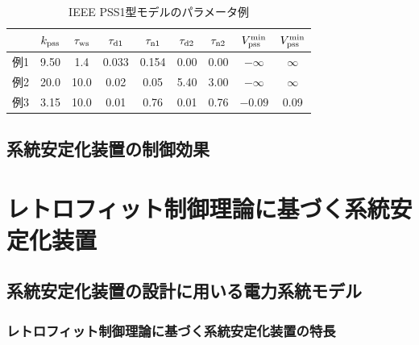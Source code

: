 \documentclass[tombow,dvipdfmx]{corona-a5-1.1}
\begin{document}
\begin{table}[h]
\medskip
 \caption{IEEE PSS1型モデルのパラメータ例}
 \label{table:psspara}
 \centering
  \begin{tabular}{|c|c|c|c|c|c|c|c|c|}
   \hline
 &  $k_{\rm pss}$ & $\tau_{\rm ws}$ & $\tau_{{\rm d}1}$ & $\tau_{{\rm n}1}$ & $\tau_{{\rm d}2}$ & $\tau_{{\rm n}2}$ & $V_{\rm pss}^{\rm min}$ & $V_{\rm pss}^{\rm min}$ \\
   \hline \hline
   例1 \cite[12.5節]{kundur1994power}& 9.50 & 1.4 & 0.033 & 0.154 & 0.00 & 0.00 & $-\infty$ & $\infty$ \\
   \hline   
   例2 \cite[12.8節]{kundur1994power}& 20.0 & 10.0 & 0.02 & 0.05 & 5.40 & 3.00 & $-\infty$ & $\infty$ \\
   \hline
   例3 \cite[Table H.3]{ieee2016ieee}& 3.15 & 10.0 & 0.01 & 0.76 & 0.01 & 0.76 & $-0.09$ & 0.09\\
   \hline
  \end{tabular}
\end{table}




\subsection{系統安定化装置の制御効果}

\begin{例}[xxx]\label{ex:psseffect}
\end{例}


\section{レトロフィット制御理論に基づく系統安定化装置\advanced}

\subsection{系統安定化装置の設計に用いる電力系統モデル\advanced}

\subsubsection{レトロフィット制御理論に基づく系統安定化装置の特長}
\end{document}
